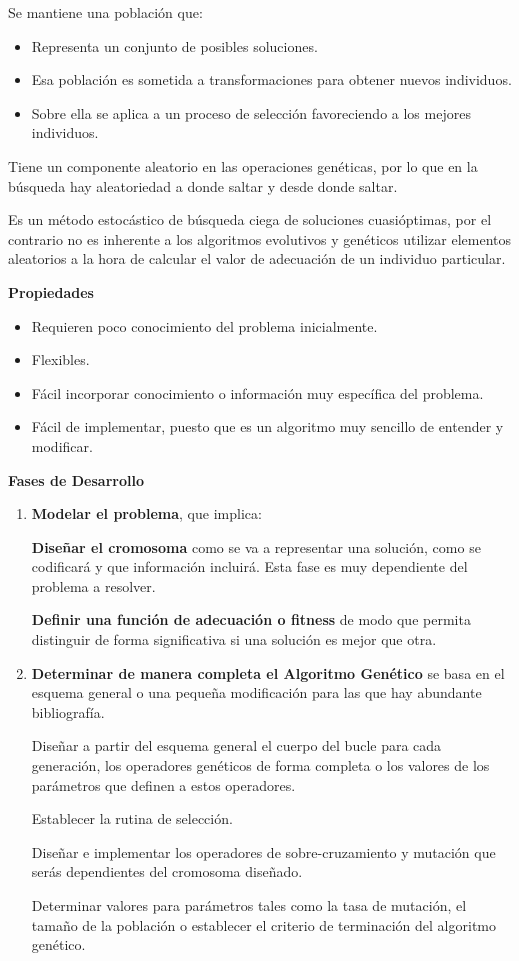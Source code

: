 \documentclass[12pt, twoside, openright]{report} %
\begin{document}
Se mantiene una población que:
\begin{itemize}
	\item Representa un conjunto de posibles soluciones.
	\item Esa población es sometida a transformaciones para obtener nuevos individuos.
	\item Sobre ella se aplica a un proceso de selección favoreciendo a los mejores individuos.
\end{itemize}

Tiene un componente aleatorio en las operaciones genéticas, por lo que en la búsqueda hay aleatoriedad a donde saltar y desde donde saltar. 

Es un método estocástico de búsqueda ciega de soluciones cuasióptimas, por el contrario no es inherente a los algoritmos evolutivos y genéticos  utilizar elementos aleatorios a la hora de calcular el valor de adecuación de un individuo particular.

\textbf{Propiedades}
\begin{itemize}
	\item Requieren poco conocimiento del problema inicialmente.
	\item Flexibles.
	\item Fácil incorporar conocimiento o información muy específica del problema.
	\item Fácil de implementar, puesto que es un algoritmo muy sencillo de entender y modificar.
\end{itemize}

\textbf{Fases de Desarrollo}
\begin{enumerate}
	\item \textbf{Modelar el problema}, que implica:
	      
	      \textbf{Diseñar el cromosoma} como se va a representar una solución, como se codificará y que información incluirá. Esta fase es muy dependiente del problema a resolver.
	      
	      \textbf{Definir una función de adecuación o fitness} de modo que permita distinguir de forma significativa si una solución es mejor que otra.
	\item \textbf{Determinar de manera completa el Algoritmo Genético} se basa en el esquema general o una pequeña modificación para las que hay abundante bibliografía.
	      
	      Diseñar a partir del esquema general el cuerpo del bucle para cada generación, los operadores genéticos de forma completa o los valores de los parámetros que definen a estos operadores.
	      
	      Establecer la rutina de selección.
	      
	      Diseñar e implementar los operadores de sobre-cruzamiento y mutación que serás dependientes del cromosoma diseñado.
	      
	      Determinar valores para parámetros tales como la tasa de mutación, el tamaño de la población o establecer el criterio de terminación del algoritmo genético.
\end{enumerate}
\end{document}
